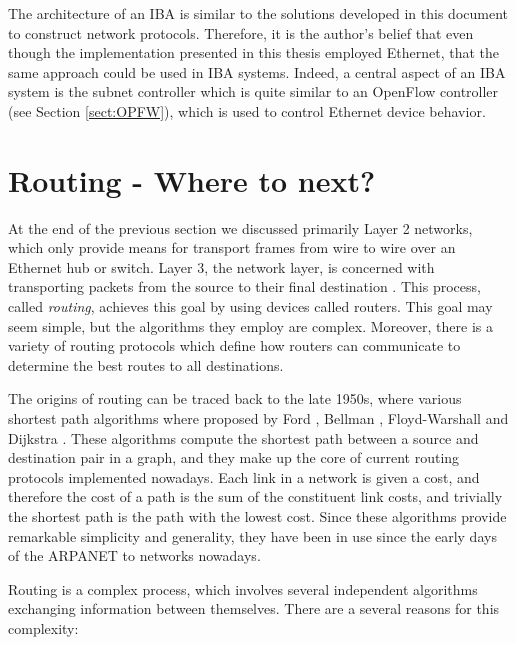  The architecture of an IBA is similar to the solutions developed in this document to construct network protocols. Therefore, it is the author's belief that even though the implementation presented in this thesis employed Ethernet, that the same approach could be used in IBA systems. Indeed, a central aspect of an IBA system is the subnet controller which is quite similar to an OpenFlow controller (see Section \ref{sect:OPFW}), which is used to control Ethernet device behavior. 	    


\section{Routing - Where to next?}

At the end of the previous section we discussed primarily Layer 2 networks, which only provide means for transport frames from wire to wire over an Ethernet hub or switch. Layer 3, the network layer, is concerned with transporting packets from the source to their final destination \cite{DataNetworks}. This process, called \textit{routing}, achieves this goal by using devices called routers. This goal may seem simple, but the algorithms they employ are complex. Moreover, there is a variety of routing protocols which define how routers can communicate to determine the best routes to all destinations.

The origins of routing can be traced back to the late 1950s, where various shortest path algorithms where proposed by Ford \cite{Ford1956}, Bellman \cite{Bellman1958}, Floyd-Warshall \cite{WARSHALL1962} and Dijkstra \cite{DIJK}. These algorithms compute the shortest path between a source and destination pair in a graph, and they make up the core of current routing protocols implemented nowadays. Each link in a network is given a cost, and therefore the cost of a path is the sum of the constituent link costs, and trivially the shortest path is the path with the lowest cost. Since these algorithms provide remarkable simplicity and generality, they have been in use since the early days of the ARPANET \cite{ARPANET} to networks nowadays.

Routing is a complex process, which involves several independent algorithms exchanging information between themselves. There are a several reasons for this complexity:

